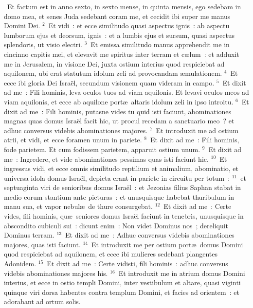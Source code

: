 ~Et factum est in anno sexto, in sexto mense, in quinta mensis, ego sedebam in domo mea, et senes Juda sedebant coram me, et cecidit ibi super me manus Domini Dei.
${}^{2}$~Et vidi~: et ecce similitudo quasi aspectus ignis~: ab aspectu lumborum ejus et deorsum, ignis~: et a lumbis ejus et sursum, quasi aspectus splendoris, ut visio electri.
${}^{3}$~Et emissa similitudo manus apprehendit me in cincinno capitis mei, et elevavit me spiritus inter terram et c\ae lum~: et adduxit me in Jerusalem, in visione Dei, juxta ostium interius quod respiciebat ad aquilonem, ubi erat statutum idolum zeli ad provocandam \ae mulationem.
${}^{4}$~Et ecce ibi gloria Dei Isra\"el, secundum visionem quam videram in campo.
${}^{5}$~Et dixit ad me~: Fili hominis, leva oculos tuos ad viam aquilonis. Et levavi oculos meos ad viam aquilonis, et ecce ab aquilone port\ae\ altaris idolum zeli in ipso introitu.
${}^{6}$~Et dixit ad me~: Fili hominis, putasne vides tu quid isti faciunt, abominationes magnas quas domus Isra\"el facit hic, ut procul recedam a sanctuario meo~? et adhuc conversus videbis abominationes majores.
${}^{7}$~Et introduxit me ad ostium atrii, et vidi, et ecce foramen unum in pariete.
${}^{8}$~Et dixit ad me~: Fili hominis, fode parietem. Et cum fodissem parietem, apparuit ostium unum.
${}^{9}$~Et dixit ad me~: Ingredere, et vide abominationes pessimas quas isti faciunt hic.
${}^{10}$~Et ingressus vidi, et ecce omnis similitudo reptilium et animalium, abominatio, et universa idola domus Isra\"el, depicta erant in pariete in circuitu per totum~:
${}^{11}$~et septuaginta viri de senioribus domus Isra\"el~: et Jezonias filius Saphan stabat in medio eorum stantium ante picturas~: et unusquisque habebat thuribulum in manu sua, et vapor nebul\ae\ de thure consurgebat.
${}^{12}$~Et dixit ad me~: Certe vides, fili hominis, qu\ae\ seniores domus Isra\"el faciunt in tenebris, unusquisque in abscondito cubiculi sui~: dicunt enim~: Non videt Dominus nos~; dereliquit Dominus terram.
${}^{13}$~Et dixit ad me~: Adhuc conversus videbis abominationes majores, quas isti faciunt.
${}^{14}$~Et introduxit me per ostium port\ae\ domus Domini quod respiciebat ad aquilonem, et ecce ibi mulieres sedebant plangentes Adonidem.
${}^{15}$~Et dixit ad me~: Certe vidisti, fili hominis~: adhuc conversus videbis abominationes majores his.
${}^{16}$~Et introduxit me in atrium domus Domini interius, et ecce in ostio templi Domini, inter vestibulum et altare, quasi viginti quinque viri dorsa habentes contra templum Domini, et facies ad orientem~: et adorabant ad ortum solis.
